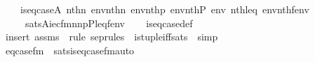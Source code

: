 \begin{isabellebody}
\ \ \ \ {\isachardoublequoteopen}is{\isacharunderscore}{\kern0pt}eq{\isacharunderscore}{\kern0pt}case{\isacharparenleft}{\kern0pt}{\isacharhash}{\kern0pt}{\isacharhash}{\kern0pt}A{\isacharcomma}{\kern0pt}\ nth{\isacharparenleft}{\kern0pt}n{}{\isacharcomma}{\kern0pt}\ env{\isacharparenright}{\kern0pt}{\isacharcomma}{\kern0pt}nth{\isacharparenleft}{\kern0pt}n{}{\isacharcomma}{\kern0pt}\ env{\isacharparenright}{\kern0pt}{\isacharcomma}{\kern0pt}nth{\isacharparenleft}{\kern0pt}p{\isacharcomma}{\kern0pt}\ env{\isacharparenright}{\kern0pt}{\isacharcomma}{\kern0pt}nth{\isacharparenleft}{\kern0pt}P{\isacharcomma}{\kern0pt}\ env{\isacharparenright}{\kern0pt}{\isacharcomma}{\kern0pt}\ nth{\isacharparenleft}{\kern0pt}leq{\isacharcomma}{\kern0pt}\ env{\isacharparenright}{\kern0pt}{\isacharcomma}{\kern0pt}nth{\isacharparenleft}{\kern0pt}f{\isacharcomma}{\kern0pt}env{\isacharparenright}{\kern0pt}{\isacharparenright}{\kern0pt}\isanewline
\ \ \ \ {\isasymlongleftrightarrow}\ sats{\isacharparenleft}{\kern0pt}A{\isacharcomma}{\kern0pt}{\isacharquery}{\kern0pt}iec{\isacharunderscore}{\kern0pt}fm{\isacharparenleft}{\kern0pt}n{}{\isacharcomma}{\kern0pt}n{}{\isacharcomma}{\kern0pt}p{\isacharcomma}{\kern0pt}P{\isacharcomma}{\kern0pt}leq{\isacharcomma}{\kern0pt}f{\isacharparenright}{\kern0pt}{\isacharcomma}{\kern0pt}env{\isacharparenright}{\kern0pt}{\isachardoublequoteclose}\isanewline
%
\isadelimproof
\ \ %
\endisadelimproof
%
\isatagproof
{}\isamarkupfalse%
\ is{\isacharunderscore}{\kern0pt}eq{\isacharunderscore}{\kern0pt}case{\isacharunderscore}{\kern0pt}def\isanewline
\ \ \isamarkupfalse%
\ {\isacharparenleft}{\kern0pt}insert\ assms\ {\isacharsemicolon}{\kern0pt}\ {\isacharparenleft}{\kern0pt}rule\ sep{\isacharunderscore}{\kern0pt}rules{\isacharprime}{\kern0pt}\ \ is{\isacharunderscore}{\kern0pt}tuple{\isacharunderscore}{\kern0pt}iff{\isacharunderscore}{\kern0pt}sats\ {\isacharbar}{\kern0pt}\ simp{\isacharparenright}{\kern0pt}{\isacharplus}{\kern0pt}{\isacharparenright}{\kern0pt}%
\endisatagproof
{\isafoldproof}%
%
\isadelimproof
\isanewline
%
\endisadelimproof
%
\isadelimML
\isanewline
%
\endisadelimML
%
\isatagML
{}\isamarkupfalse%
\ {\isachardoublequoteopen}eq{\isacharunderscore}{\kern0pt}case{\isacharunderscore}{\kern0pt}fm{\isachardoublequoteclose}\ \ sats{\isacharunderscore}{\kern0pt}is{\isacharunderscore}{\kern0pt}eq{\isacharunderscore}{\kern0pt}case{\isacharunderscore}{\kern0pt}fm{\isacharunderscore}{\kern0pt}auto%

\end{isabellebody}
